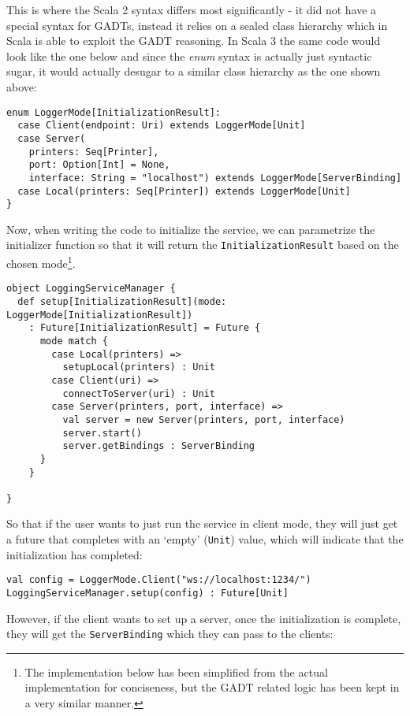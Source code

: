 This is where the Scala 2 syntax differs most significantly - it did not have a special syntax for GADTs, instead it relies on a sealed class hierarchy which in Scala is able to exploit the GADT reasoning. In Scala 3 the same code would look like the one below and since the \textit{enum} syntax is actually just syntactic sugar, it would actually desugar to a similar class hierarchy as the one shown above:

\begin{verbatim}
enum LoggerMode[InitializationResult]:
  case Client(endpoint: Uri) extends LoggerMode[Unit]
  case Server(
    printers: Seq[Printer], 
    port: Option[Int] = None, 
    interface: String = "localhost") extends LoggerMode[ServerBinding]
  case Local(printers: Seq[Printer]) extends LoggerMode[Unit]
}
\end{verbatim}

Now, when writing the code to initialize the service, we can parametrize the initializer function so that it will return the \texttt{InitializationResult} based on the chosen mode\footnote{The implementation below has been simplified from the actual implementation for conciseness, but the GADT related logic has been kept in a very similar manner.}.

\begin{verbatim}
object LoggingServiceManager {
  def setup[InitializationResult](mode: LoggerMode[InitializationResult])
    : Future[InitializationResult] = Future {
      mode match {
        case Local(printers) =>
          setupLocal(printers) : Unit
        case Client(uri) =>
          connectToServer(uri) : Unit
        case Server(printers, port, interface) =>
          val server = new Server(printers, port, interface)
          server.start()
          server.getBindings : ServerBinding
      }
    }
    
}
\end{verbatim}

So that if the user wants to just run the service in client mode, they will just get a future that completes with an `empty' (\texttt{Unit}) value, which will indicate that the initialization has completed:

\begin{verbatim}
val config = LoggerMode.Client("ws://localhost:1234/")
LoggingServiceManager.setup(config) : Future[Unit]
\end{verbatim}

However, if the client wants to set up a server, once the initialization is complete, they will get the \texttt{ServerBinding} which they can pass to the clients:

